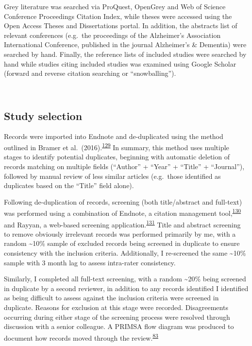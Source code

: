 \documentclass[a4paper, twoside]{templates/ociamthesis}
\begin{document}
Grey literature was searched via ProQuest, OpenGrey and Web of Science Conference Proceedings Citation Index, while theses were accessed using the Open Access Theses and Dissertations portal. In addition, the abstracts list of relevant conferences (e.g.~the proceedings of the Alzheimer's Association International Conference, published in the journal Alzheimer's \& Dementia) were searched by hand. Finally, the reference lists of included studies were searched by hand while studies citing included studies was examined using Google Scholar (forward and reverse citation searching or ``snowballing'').

~

\hypertarget{study-selection}{%
\subsection{Study selection}\label{study-selection}}

Records were imported into Endnote and de-duplicated using the method outlined in Bramer et al.~(2016).\textsuperscript{\protect\hyperlink{ref-bramer2016}{129}} In summary, this method uses multiple stages to identify potential duplicates, beginning with automatic deletion of records matching on multiple fields (``Author'' + ``Year'' + ``Title'' + ``Journal''), followed by manual review of less similar articles (e.g.~those identified as duplicates based on the ``Title'' field alone).

Following de-duplication of records, screening (both title/abstract and full-text) was performed using a combination of Endnote, a citation management tool,\textsuperscript{\protect\hyperlink{ref-hupe2019}{130}} and Rayyan, a web-based screening application.\textsuperscript{\protect\hyperlink{ref-ouzzani2016}{131}} Title and abstract screening to remove obviously irrelevant records was performed primarily by me, with a random \textasciitilde10\% sample of excluded records being screened in duplicate to ensure consistency with the inclusion criteria. Additionally, I re-screened the same \textasciitilde10\% sample with 3 month lag to assess intra-rater consistency.

Similarly, I completed all full-text screening, with a random \textasciitilde20\% being screened in duplicate by a second reviewer, in addition to any records identified I identified as being difficult to assess against the inclusion criteria were screened in duplicate. Reasons for exclusion at this stage were recorded. Disagreements occurring during either stage of the screening process were resolved through discussion with a senior colleague. A PRIMSA flow diagram was produced to document how records moved through the review.\textsuperscript{\protect\hyperlink{ref-page2021}{83}}
\end{document}
